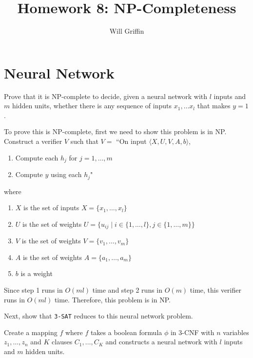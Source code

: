 \documentclass{article}
\title{Homework 8: NP-Completeness}
\author{Will Griffin}
\begin{document}
    \maketitle

    \section{Neural Network}

        Prove that it is NP-complete to decide, given a neural network with $l$ inputs and $m$ hidden units, whether there is any sequence of inputs $x_1, \ldots x_l$ that makes $y = 1$.

        To prove this is NP-complete, first we need to show this problem is in NP. Construct a verifier $V$ such that $V = $ ``On input $\langle X, U, V, A, b \rangle$, 
        \begin{enumerate}[1.]
            \item Compute each $h_j$ for $j = 1, \dots, m$

            \item Compute $y$ using each $h_j$"
        \end{enumerate}
        where 
        \begin{enumerate}[-]
            \item $X$ is the set of inputs $X = \{x_1, \ldots, x_l\}$

            \item $U$ is the set of weights $U = \{u_{ij} \mid i \in \{1, \ldots, l\}, j \in \{1, \ldots, m\}\}$

            \item $V$ is the set of weights $V = \{v_1, \ldots, v_m\}$

            \item $A$ is the set of weights $A = \{a_1, \ldots, a_m\}$

            \item $b$ is a weight
        \end{enumerate}
        
        Since step 1 runs in $O(ml)$ time and step 2 runs in $O(m)$ time, this verifier runs in $O(ml)$ time. Therefore, this problem is in NP.

        Next, show that \texttt{3-SAT} reduces to this neural network problem.

        Create a mapping $f$ where $f$ takes a boolean formula $\phi$ in 3-CNF with $n$ variables $z_1, \ldots, z_n$ and $K$ clauses $C_1, \ldots, C_K$ and constructs a neural network with $l$ inputs and $m$ hidden units. 
\end{document}
